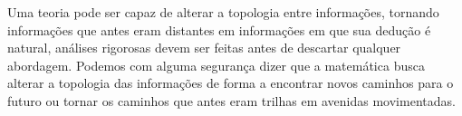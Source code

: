 \documentclass[10pt,a4paper]{report}
\begin{document}
\hspace{\baselineskip}

Uma teoria pode ser capaz de alterar a topologia entre informações, tornando informações que antes eram distantes em informações em que sua dedução é natural, análises rigorosas devem ser feitas antes de descartar qualquer abordagem. Podemos com alguma segurança dizer que a matemática busca alterar a topologia das informações de forma a encontrar novos caminhos para o futuro ou tornar os caminhos que antes eram trilhas em avenidas movimentadas.







\end{document}
